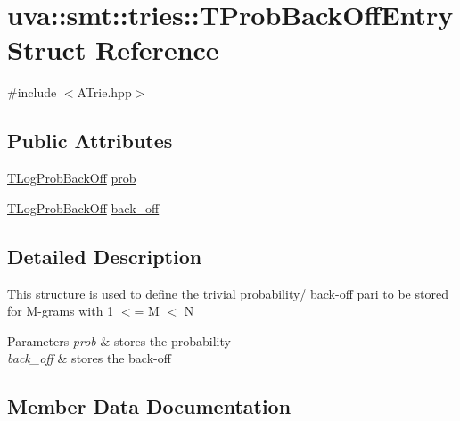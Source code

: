 \hypertarget{structuva_1_1smt_1_1tries_1_1_t_prob_back_off_entry}{}\section{uva\+:\+:smt\+:\+:tries\+:\+:T\+Prob\+Back\+Off\+Entry Struct Reference}
\label{structuva_1_1smt_1_1tries_1_1_t_prob_back_off_entry}


{\ttfamily \#include $<$A\+Trie.\+hpp$>$}

\subsection*{Public Attributes}
\begin{DoxyCompactItemize}
\item 
\hyperlink{namespaceuva_1_1smt_1_1tries_acd0660255dd9ef5d644f01de49102750}{T\+Log\+Prob\+Back\+Off} \hyperlink{structuva_1_1smt_1_1tries_1_1_t_prob_back_off_entry_a214a33956ad703bd35a5aa83f99f7b92}{prob}
\item 
\hyperlink{namespaceuva_1_1smt_1_1tries_acd0660255dd9ef5d644f01de49102750}{T\+Log\+Prob\+Back\+Off} \hyperlink{structuva_1_1smt_1_1tries_1_1_t_prob_back_off_entry_acd9e9871fbaf91450225855e5c510145}{back\+\_\+off}
\end{DoxyCompactItemize}


\subsection{Detailed Description}
This structure is used to define the trivial probability/ back-\/off pari to be stored for M-\/grams with 1 $<$= M $<$ N 
\begin{DoxyParams}{Parameters}
{\em prob} & stores the probability \\
\hline
{\em back\+\_\+off} & stores the back-\/off \\
\hline
\end{DoxyParams}


\subsection{Member Data Documentation}
\hypertarget{structuva_1_1smt_1_1tries_1_1_t_prob_back_off_entry_acd9e9871fbaf91450225855e5c510145}{}
